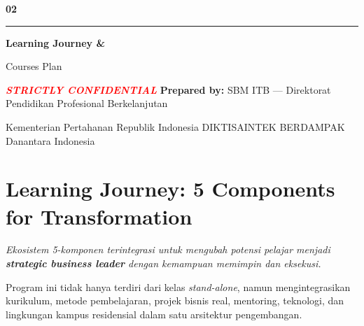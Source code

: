 \begin{tcolorbox}[enhanced,height=7.1cm,colback=navy,colframe=navy,boxrule=0pt,
  arc=0pt,valign=center,left=14mm,right=14mm]
\color{white}
\begin{minipage}[c]{.27\textwidth}\centering
{\fontsize{76}{80}\selectfont\bfseries 02}\par\vspace{2mm}
{\color{cyanlearn}\rule{.82\linewidth}{1.5pt}}
\end{minipage}\hfill
\begin{minipage}[c]{.66\textwidth}
{\fontsize{34}{39}\selectfont\bfseries Learning Journey \&\par Courses Plan}
\end{minipage}
\end{tcolorbox}

\begin{center}
\textcolor{red}{\bfseries\itshape STRICTLY CONFIDENTIAL}\qquad
\textbf{Prepared by:} SBM ITB --- Direktorat Pendidikan Profesional Berkelanjutan\par
Kementerian Pertahanan Republik Indonesia \textbullet{} DIKTISAINTEK BERDAMPAK \textbullet{} Danantara Indonesia
\end{center}

\section{Learning Journey: 5 Components for Transformation}
\textit{Ekosistem 5-komponen terintegrasi untuk mengubah potensi pelajar menjadi
\textbf{strategic business leader} dengan kemampuan memimpin dan eksekusi.}

\begin{tcolorbox}[colback=lightblue,colframe=navy,boxrule=.8pt,arc=2mm,
  title={Integrated Design Logic},colbacktitle=navy,coltitle=white,fonttitle=\bfseries]
Program ini tidak hanya terdiri dari kelas \textit{stand-alone}, namun mengintegrasikan kurikulum, metode pembelajaran, projek bisnis real, mentoring, teknologi, dan lingkungan kampus residensial dalam satu arsitektur pengembangan.
\end{tcolorbox}

